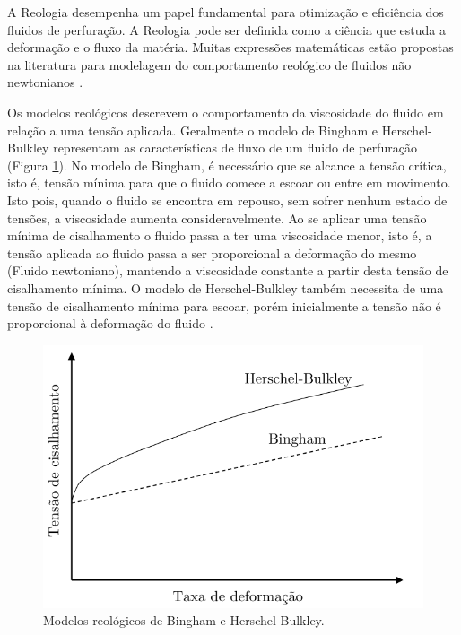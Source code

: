 A Reologia desempenha um papel fundamental para otimização e eficiência dos fluidos de perfuração. A Reologia pode ser definida como a ciência que estuda a deformação e o fluxo da matéria. Muitas expressões matemáticas estão propostas na literatura para modelagem  do comportamento reológico de fluidos não newtonianos \cite{reology}.  

Os modelos reológicos descrevem o comportamento da viscosidade do fluido em relação a uma tensão aplicada. Geralmente o modelo de  Bingham e Herschel-Bulkley
representam as características de fluxo de um fluido de perfuração (Figura \ref {fig:bingham}). No modelo de Bingham, é necessário que se alcance a tensão crítica, isto é, tensão mínima para que o fluido comece a
escoar ou entre em movimento. Isto pois, quando o fluido se encontra em repouso, sem sofrer nenhum estado de tensões, a viscosidade aumenta consideravelmente. Ao se aplicar uma tensão mínima de cisalhamento o fluido passa a ter uma viscosidade menor, isto é, a tensão aplicada ao fluido passa a ser proporcional a deformação do mesmo (Fluido newtoniano), mantendo a viscosidade constante a partir desta tensão de cisalhamento mínima. O modelo de Herschel-Bulkley
também necessita de uma tensão de cisalhamento mínima para escoar, porém inicialmente a tensão não é proporcional à deformação do fluido \cite{thomas}. 


\begin{figure}[H]
    \centering
    \includegraphics[scale=0.86]{Figuras/bingham.pdf}
    \caption{Modelos reológicos de Bingham e Herschel-Bulkley.}
    \label{fig:bingham}
\end{figure}

